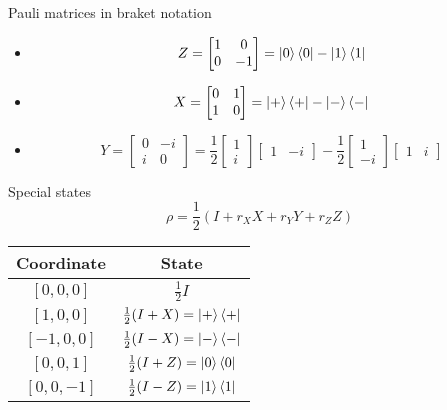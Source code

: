 \documentclass{beamer}
\begin{document}
\begin{frame}{Pauli matrices in braket notation}
\begin{itemize}
\setlength{\itemsep}{3em}
\item 
\begin{equation*}
Z=\begin{bmatrix}1&0\\0&-1\end{bmatrix}=
\ket{0}\bra{0}
-\ket{1}\bra{1}
\end{equation*}
\item 
\begin{equation*}
X=\begin{bmatrix}0&1\\1&0\end{bmatrix}=
\ket{+}\bra{+}
-\ket{-}\bra{-}
\end{equation*}
\item 
\begin{equation*}
Y=\begin{bmatrix}0&-i\\i&0\end{bmatrix}=
\frac12\begin{bmatrix}1\\i\end{bmatrix}\begin{bmatrix}1&-i\end{bmatrix}
-\frac12\begin{bmatrix}1\\-i\end{bmatrix}\begin{bmatrix}1&i\end{bmatrix}
\end{equation*}
\end{itemize}
\end{frame}

\begin{frame}{Special states}
\begin{equation*}
\rho = \frac12\left(I + r_X X + r_Y Y + r_Z Z\right)
\end{equation*}
\centering
\renewcommand{\arraystretch}{1.5}
\begin{tabular}{|c|c|}
\hline
Coordinate & State\\
\hline
$[0,0,0]$ & $\frac12 I$\\
$[1,0,0]$ & $\frac12 (I+X)=\ket{+}\bra{+}$\\
$[-1,0,0]$ & $\frac12 (I-X)=\ket{-}\bra{-}$\\
$[0,0,1]$ & $\frac12 (I+Z)=\ket{0}\bra{0}$\\
$[0,0,-1]$ & $\frac12 (I-Z)=\ket{1}\bra{1}$\\
\hline
\end{tabular}
\end{frame}
\end{document}
